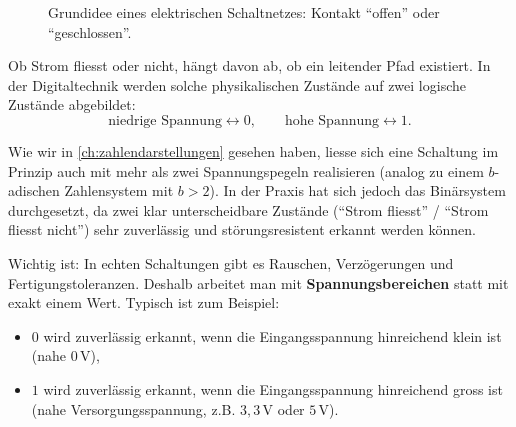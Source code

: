 \begin{figure}[H]
    \caption{Grundidee eines elektrischen Schaltnetzes: Kontakt \enquote{offen} oder \enquote{geschlossen}.}
    \label{fig:stromkreis_grundidee}
\end{figure}

Ob Strom fliesst oder nicht, hängt davon ab, ob ein leitender Pfad existiert. In der Digitaltechnik werden solche physikalischen Zustände auf zwei logische Zustände abgebildet:
\[
    \text{niedrige Spannung} \longleftrightarrow 0,
    \qquad
    \text{hohe Spannung} \longleftrightarrow 1.
\]

\begin{myremark}
    Wie wir in \cref{ch:zahlendarstellungen} gesehen haben, liesse sich eine Schaltung im Prinzip auch mit mehr als zwei Spannungspegeln realisieren (analog zu einem $b$-adischen Zahlensystem mit $b>2$). In der Praxis hat sich jedoch das Binärsystem durchgesetzt, da zwei klar unterscheidbare Zustände (\enquote{Strom fliesst} / \enquote{Strom fliesst nicht}) sehr zuverlässig und störungsresistent erkannt werden können.
\end{myremark}

Wichtig ist: In echten Schaltungen gibt es Rauschen, Verzögerungen und Fertigungstoleranzen. Deshalb arbeitet man mit \textbf{Spannungsbereichen} statt mit exakt einem Wert. Typisch ist zum Beispiel:
\begin{itemize}
    \item $0$ wird zuverlässig erkannt, wenn die Eingangsspannung hinreichend klein ist (nahe $0\,\mathrm{V}$),
    \item $1$ wird zuverlässig erkannt, wenn die Eingangsspannung hinreichend gross ist (nahe Versorgungsspannung, z.B. $3{,}3\,\mathrm{V}$ oder $5\,\mathrm{V}$).
\end{itemize}

